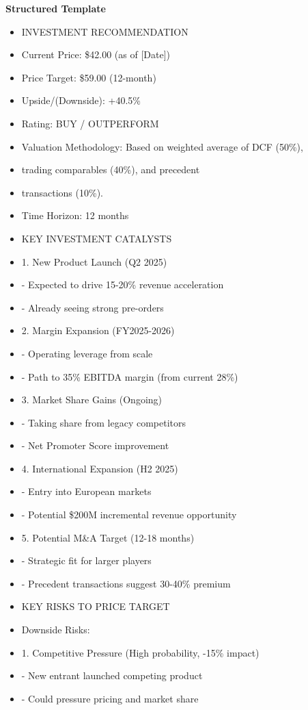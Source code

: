 \documentclass[11pt]{article}
\begin{document}
\textbf{Structured Template}
\begin{itemize}[leftmargin=*,itemsep=2pt,topsep=2pt]
\item {} INVESTMENT RECOMMENDATION
\item {} Current Price: \$42.00 (as of [Date])
\item {} Price Target: \$59.00 (12-month)
\item {} Upside/(Downside): +40.5\%
\item {} Rating: BUY / OUTPERFORM
\item {} Valuation Methodology: Based on weighted average of DCF (50\%),
\item {} trading comparables (40\%), and precedent
\item {} transactions (10\%).
\item {} Time Horizon: 12 months
\item {} KEY INVESTMENT CATALYSTS
\item {} 1. New Product Launch (Q2 2025)
\item {} - Expected to drive 15-20\% revenue acceleration
\item {} - Already seeing strong pre-orders
\item {} 2. Margin Expansion (FY2025-2026)
\item {} - Operating leverage from scale
\item {} - Path to 35\% EBITDA margin (from current 28\%)
\item {} 3. Market Share Gains (Ongoing)
\item {} - Taking share from legacy competitors
\item {} - Net Promoter Score improvement
\item {} 4. International Expansion (H2 2025)
\item {} - Entry into European markets
\item {} - Potential \$200M incremental revenue opportunity
\item {} 5. Potential M\&A Target (12-18 months)
\item {} - Strategic fit for larger players
\item {} - Precedent transactions suggest 30-40\% premium
\item {} KEY RISKS TO PRICE TARGET
\item {} Downside Risks:
\item {} 1. Competitive Pressure (High probability, -15\% impact)
\item {} - New entrant launched competing product
\item {} - Could pressure pricing and market share

\end{itemize}
\end{document}
